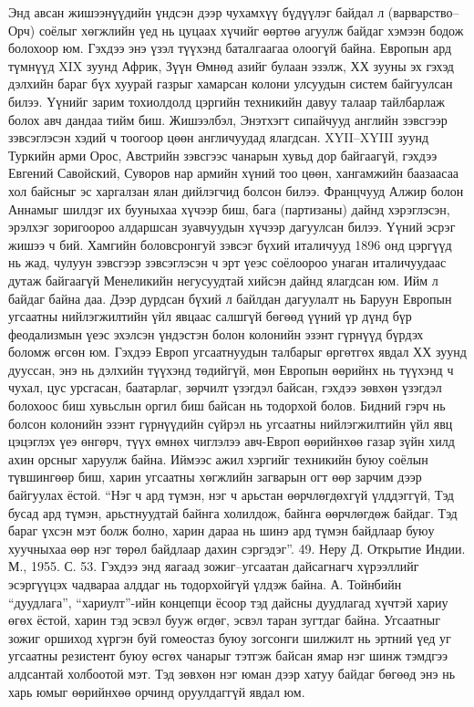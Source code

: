 Энд авсан жишээнүүдийн үндсэн дээр чухамхүү бүдүүлэг байдал л (варварство–Орч) соёлыг хөгжлийн үед нь цуцаах хүчийг өөртөө агуулж байдаг хэмээн бодож болохоор юм. Гэхдээ энэ үзэл түүхэнд баталгаагаа олоогүй байна. Европын ард түмнүүд XIX зуунд Африк, Зүүн Өмнөд азийг булаан эзэлж, ХХ зууны эх гэхэд дэлхийн бараг бүх хуурай газрыг хамарсан колони улсуудын систем байгуулсан билээ. Үүнийг зарим тохиолдолд цэргийн техникийн давуу талаар тайлбарлаж болох авч дандаа тийм биш. Жишээлбэл, Энэтхэгт сипайчууд английн зэвсгээр зэвсэглэсэн хэдий ч тоогоор цөөн англичуудад ялагдсан. XYII–XYIII зуунд Туркийн арми Орос, Австрийн зэвсгээс чанарын хувьд дор байгаагүй, гэхдээ Евгений Савойский, Суворов нар армийн хүний тоо цөөн, хангамжийн баазаасаа хол байсныг эс харгалзан ялан дийлэгчид болсон билээ. Францчууд Алжир болон Аннамыг шилдэг их бууныхаа хүчээр биш, бага (партизаны) дайнд хэрэглэсэн, эрэлхэг зоригоороо алдаршсан зуавчуудын хүчээр дагуулсан билээ. Үүний эсрэг жишээ ч бий. Хамгийн боловсронгуй зэвсэг бүхий италичууд 1896 онд цэргүүд нь жад, чулуун зэвсгээр зэвсэглэсэн ч эрт үеэс соёлоороо унаган италичуудаас дутаж байгаагүй Менеликийн негусуудтай хийсэн дайнд ялагдсан юм. Ийм л байдаг байна даа.
Дээр дурдсан бүхий л байлдан дагуулалт нь Баруун Европын угсаатны нийлэгжилтийн үйл явцаас салшгүй бөгөөд үүний үр дүнд бүр феодализмын үеэс эхэлсэн үндэстэн болон колонийн эзэнт гүрнүүд бүрдэх боломж өгсөн юм. Гэхдээ Европ угсаатнуудын талбарыг өргөтгөх явдал ХХ зуунд дууссан, энэ нь дэлхийн түүхэнд төдийгүй, мөн Европын өөрийнх нь түүхэнд ч чухал, цус урсгасан, баатарлаг, зөрчилт үзэгдэл байсан, гэхдээ зөвхөн үзэгдэл болохоос биш хувьслын оргил биш байсан нь тодорхой болов. Бидний гэрч нь болсон колонийн эзэнт гүрнүүдийн сүйрэл нь угсаатны нийлэгжилтийн үйл явц цэцэглэх үеэ өнгөрч, түүх өмнөх чиглэлээ авч-Европ өөрийнхөө газар зүйн хилд ахин орсныг харуулж байна. Иймээс ажил хэргийг техникийн буюу соёлын түвшингөөр биш, харин угсаатны хөгжлийн загварын огт өөр зарчим дээр байгуулах ёстой. “Нэг ч ард түмэн, нэг ч арьстан өөрчлөгдөхгүй үлддэггүй, Тэд бусад ард түмэн, арьстнуудтай байнга холилдож, байнга өөрчлөгдөж байдаг. Тэд бараг үхсэн мэт болж болно, харин дараа нь шинэ ард түмэн байдлаар буюу хуучныхаа өөр нэг төрөл байдлаар дахин сэргэдэг”. 49. Неру Д. Открытие Индии. М., 1955. С. 53.
Гэхдээ энд яагаад зожиг–угсаатан дайсагнагч хүрээллийг эсэргүүцэх чадвараа алддаг нь тодорхойгүй үлдэж байна. А. Тойнбийн “дуудлага”, “хариулт”-ийн концепци ёсоор тэд дайсны дуудлагад хүчтэй хариу өгөх ёстой, харин тэд эсвэл бууж өгдөг, эсвэл таран зугтдаг байна. Угсаатныг зожиг оршиход хүргэн буй гомеостаз буюу зогсонги шилжилт нь эртний үед уг угсаатны резистент буюу өсгөх чанарыг тэтгэж байсан ямар нэг шинж тэмдгээ алдсантай холбоотой мэт. Тэд зөвхөн нэг юман дээр хатуу байдаг бөгөөд энэ нь харь юмыг өөрийнхөө орчинд оруулдаггүй явдал юм.
